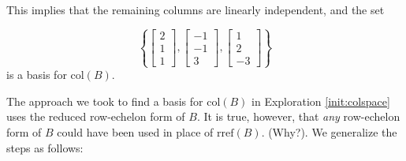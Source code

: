 \documentclass{ximera}
\begin{document}
\begin{exploration}
\begin{center}
 \end{center}

 This implies that the remaining columns are linearly independent, and the set   

 $$\left\{\begin{bmatrix}2\\1\\1\end{bmatrix},\begin{bmatrix}-1\\-1\\3\end{bmatrix}, \begin{bmatrix}1\\2\\-3\end{bmatrix}\right\}$$
 is a basis for $\mbox{col}(B)$.

 
\end{exploration}

The approach we took to find a basis for $\mbox{col}(B)$ in Exploration \ref{init:colspace} uses the reduced row-echelon form of $B$. It is true, however, that {\it any} row-echelon form of $B$ could have been used in place of $\mbox{rref}(B)$.  (Why?). We generalize the steps as follows:
\end{document}
